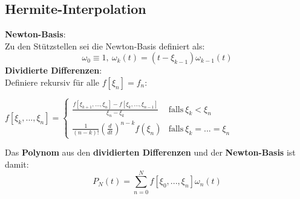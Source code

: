 \documentclass[10pt,a4paper]{article}
\begin{document}
	\subsection{Hermite-Interpolation}
	\textbf{Newton-Basis}:\\Zu den Stützstellen sei die Newton-Basis definiert als: $$\omega_0 \equiv 1,\ \omega_k(t) = (t - \xi_{k-1})\omega_{k-1}(t)$$
	\textbf{Dividierte Differenzen}:\\Definiere rekursiv für alle $f[\xi_n] = f_n$:
	\begin{center}
		$f[\xi_k,...,\xi_n] =
		\begin{cases}
			\frac{f[\xi_{k+1},...,\xi_n] - f[\xi_k,...,\xi_{n-1}]}{\xi_n - \xi_k} & \text{falls}\ \xi_k < \xi_n\\[8pt]
			\frac{1}{(n-k)!}(\frac{d}{dt})^{n-k}f(\xi_n) & \text{falls}\ \xi_k = ... = \xi_n
		\end{cases}$
	\end{center}
	Das \textbf{Polynom} aus den \textbf{dividierten Differenzen} und der \textbf{Newton-Basis} ist damit: $$P_N(t) = \sum^N_{n=0}f[\xi_0,...,\xi_n]\omega_n(t)$$
\end{document}
